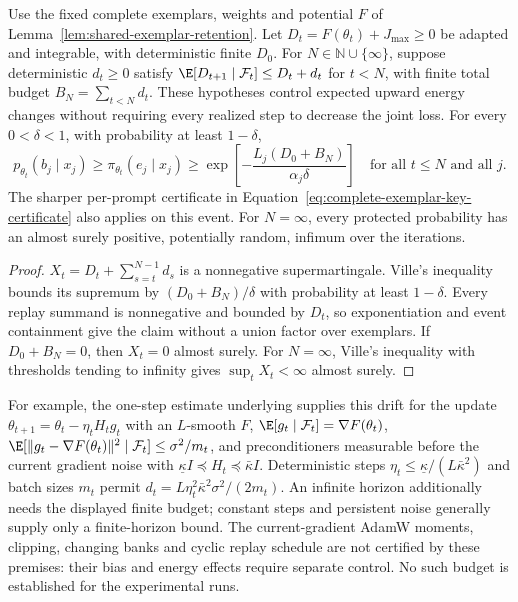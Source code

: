 \begin{corollary}
\enforcehalffinalproseline
\label{cor:replay-stochastic-energy-budget}
Use the fixed complete exemplars, weights and potential $F$ of
Lemma~\ref{lem:shared-exemplar-retention}. Let
$D_t=F(\theta_t)+J_{\max}\ge0$ be adapted and integrable, with deterministic
finite $D_0$. For $N\in\mathbb N\cup\{\infty\}$, suppose deterministic
$d_t\ge0$ satisfy $\E[D_{t+1}\mid\mathcal F_t]\le D_t+d_t$ for $t<N$,
with finite total budget $B_N=\sum_{t<N}d_t$.
These hypotheses control expected upward energy changes without requiring
every realized step to decrease the joint loss.
For every $0<\delta<1$, with probability at least $1-\delta$,
\begin{equation}
 p_{\theta_t}(b_j\mid x_j)\ge\pi_{\theta_t}(e_j\mid x_j)
 \ge\exp\!\left[-\frac{L_j(D_0+B_N)}{\alpha_j\delta}\right]
 \quad\text{for all }t\le N\text{ and all }j.
 \label{eq:replay-stochastic-energy-budget}
\end{equation}
The sharper per-prompt certificate in
Equation~\eqref{eq:complete-exemplar-key-certificate} also applies on this
event. For $N=\infty$, every protected probability has an almost surely
positive, potentially random, infimum over the iterations.
\end{corollary}
\begin{proof}
\enforcehalffinalproseline
$X_t=D_t+\sum_{s=t}^{N-1}d_s$ is a nonnegative supermartingale. Ville's
inequality bounds its supremum by $(D_0+B_N)/\delta$ with probability at
least $1-\delta$. Every replay summand is nonnegative and bounded by $D_t$,
so exponentiation and event containment give the claim without a union
factor over exemplars. If $D_0+B_N=0$, then $X_t=0$ almost surely.
For $N=\infty$, Ville's inequality with thresholds tending to infinity gives
$\sup_tX_t<\infty$ almost surely.
\end{proof}

For example, the one-step estimate underlying
\citet[Lemma~2.1, Eq.~(2.13)]{wang2017sqn} supplies this drift for the update
$\theta_{t+1}=\theta_t-\eta_tH_tg_t$ with an $L$-smooth $F$,
$\E[g_t\mid\mathcal F_t]=\nabla F(\theta_t)$,
$\E[\|g_t-\nabla F(\theta_t)\|^2\mid\mathcal F_t]\le\sigma^2/m_t$,
and preconditioners measurable before the current gradient noise with
$\underline\kappa I\preceq H_t\preceq\bar\kappa I$.
Deterministic steps $\eta_t\le\underline\kappa/(L\bar\kappa^2)$ and
batch sizes $m_t$ permit
$d_t=L\eta_t^2\bar\kappa^2\sigma^2/(2m_t)$.
An infinite horizon additionally needs the displayed finite budget;
constant steps and persistent noise generally supply only a finite-horizon
bound. The current-gradient AdamW moments, clipping, changing banks and
cyclic replay schedule are not certified by these premises: their bias and
energy effects require separate control. No such budget is established for
the experimental runs.

